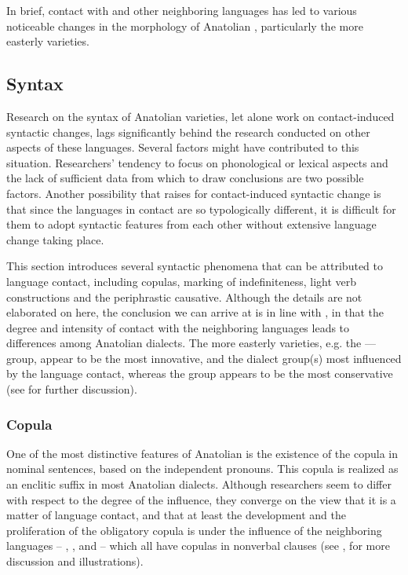 \documentclass[output=paper]{langsci/langscibook}
\begin{document}
In brief, contact with  and other neighboring languages has led to various noticeable changes in the morphology of Anatolian , particularly the more easterly varieties.

\subsection{Syntax}
Research on the syntax of Anatolian  varieties, let alone work on contact-induced syntactic changes, lags significantly behind the research conducted on other aspects of these languages. Several factors might have contributed to this situation. Researchers' tendency to focus on phonological or lexical aspects and the lack of sufficient data from which to draw conclusions  are two possible factors. Another possibility that \cite{Ingham2005} raises for contact-induced syntactic change is that since the languages in contact are so typologically different, it is difficult for them to adopt syntactic features from each other without extensive {language change} taking place.


This section introduces several syntactic phenomena that can be attributed to language contact, including copulas, marking of indefiniteness, {light verb} constructions and the {periphrastic causative}. Although the details are not elaborated on here, the conclusion we can arrive at is in line with \cite{Ingham2005}, in that the degree and intensity of contact with the neighboring languages leads to differences among Anatolian  dialects. The more easterly varieties, e.g. the ---- group, appear to be the most innovative, and the dialect group(s) most influenced by the language contact, whereas the  group appears to be the most conservative (see \citealt{Akkus2017,Jastrow2011anatolian} for further discussion).

\subsubsection{Copula}

One of the most distinctive features of Anatolian  is the existence of the {copula} in nominal sentences, based on the independent pronouns. This {copula} is realized as an enclitic suffix in most Anatolian dialects. Although researchers seem to differ with respect to the degree of the influence, they converge on the view that it is a matter of language contact, and that at least the development and the proliferation of the obligatory {copula} is under the influence of the neighboring languages -- , ,  and  -- which all have copulas in nonverbal clauses (see \citealt{Lahdo2009,Grigore2007article,Palva2011,Talay2007,Jastrow2011anatolian,Akkus2016,Akkus2017,AkkusBenmamoun2018}, for more discussion and illustrations).
\end{document}

